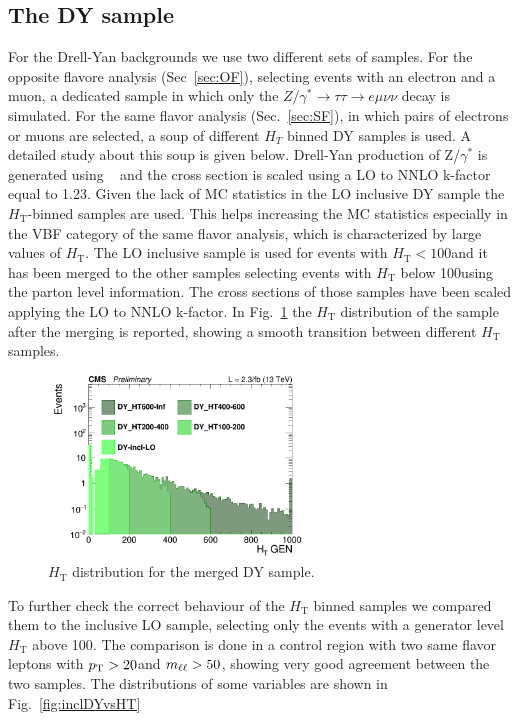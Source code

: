 \subsection*{The DY sample}\label{sec:DY}
For the Drell-Yan backgrounds we use two different sets of samples. 
For the opposite flavore analysis (Sec~\ref{sec:OF}), selecting events with an
electron and a muon, a dedicated sample in which only the
$Z/\gamma^{*}\rightarrow{}\tau\tau\rightarrow{e\mu\nu\nu}$ decay is simulated.
For the same flavor analysis (Sec.~\ref{sec:SF}), in which pairs of electrons
or muons are selected, a soup of different $H_T$ binned DY samples is used. A
detailed study about this soup is given below.
Drell-Yan production of Z/$\gamma^{*}$ is generated using \MADGRAPH~\cite{Alwall:2014hca} and the cross section is scaled using a LO to NNLO k-factor equal to 1.23. 
Given the lack of MC statistics in the LO inclusive DY sample the
$H_\mathrm{T}$-binned samples are used. This helps increasing the MC
statistics especially in the VBF category of the same flavor analysis, which is characterized by large values of $H_\mathrm{T}$.
The LO inclusive sample is used for events with $H_\mathrm{T} < 100$\GeV and it has been merged to the other samples selecting events with $H_\mathrm{T}$ below 100\GeV using the parton level information. The cross sections of those samples have been scaled applying the LO to NNLO k-factor. In Fig.~\ref{fig:DY_HT} the $H_\mathrm{T}$ distribution of the sample after the merging is reported, showing a smooth transition between different $H_\mathrm{T}$ samples.
\begin{figure}[htbp]
\centering
\includegraphics[width=0.6\textwidth]{../AN/Figs/log_c_incl_HTGen.png}
\caption{
    $H_\mathrm{T}$ distribution for the merged DY sample.}
    \label{fig:DY_HT}
\end{figure}
To further check the correct behaviour of the $H_\mathrm{T}$ binned samples we compared them to the inclusive LO sample, selecting only the events with a generator level $H_\mathrm{T}$ above 100\GeV. The comparison is done in a control region with two same flavor leptons with $p_{\mathrm{T}} > 20$\GeV and $m_{\ell\ell} > 50$\GeV, showing very good agreement between the two samples. The distributions of some variables are shown in Fig.~\ref{fig:inclDYvsHT}
